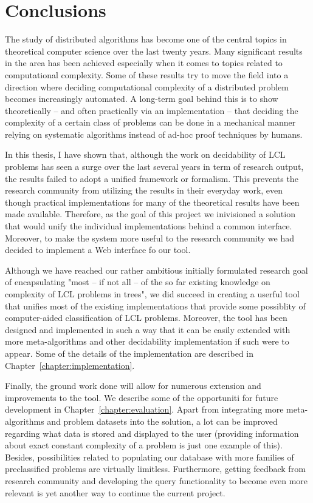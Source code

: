 \chapter{Conclusions}
\label{chapter:conclusions}

The study of distributed algorithms has become
one of the central topics in theoretical computer science
over the last twenty years. Many significant results in the area
has been achieved especially when it comes to topics related
to computational complexity. Some of these results
try to move the field into a direction where deciding
computational complexity of a distributed problem becomes
increasingly automated. A long-term goal behind this is
to show theoretically -- and often practically via an
implementation -- that deciding the complexity of a certain class
of problems can be done in a mechanical manner relying
on systematic algorithms instead of ad-hoc proof techniques
by humans.

In this thesis, I have shown that, although the work on
decidability of LCL problems has seen a surge over the last
several years in term of research output, the results
failed to adopt a unified framework or formalism. This
prevents the research community from utilizing the
results in their everyday work, even though practical
implementations for many of the theoretical results have been
made available. Therefore, as the goal of this project we
inivisioned a solution that would unify the individual
implementations behind a common interface. Moreover, to make
the system more useful to the research community we had decided
to implement a Web interface fo our tool.

Although we have reached our rather ambitious initially formulated
research goal of encapsulating "most -- if not
all -- of
the so far existing knowledge on complexity of LCL
problems in trees", we did succeed in creating a userful
tool that unifies most of the existing implementations that
provide some possiblity of computer-aided classification of LCL
problems. Moreover, the tool has been designed and implemented in
such a way that it can be easily extended with more meta-algorithms
and other decidability implementation if such were to appear.
Some of the details of the implementation are described
in Chapter~\ref{chapter:implementation}.

Finally, the ground work done will allow for numerous
extension and improvements to the tool. We describe
some of the opportuniti for future development in
Chapter~\ref{chapter:evaluation}. Apart from
integrating more meta-algorithms and problem datasets into the
solution, a lot can be improved regarding what data
is stored and displayed to the user
(providing information about exact constant complexity of
a problem is just one example of this). Besides,
possibilities related to populating our database with more
families of preclassified problems are virtually limitless.
Furthermore, getting feedback from research community and
developing the query functionality to become even more
relevant is yet another way to continue the current
project.
